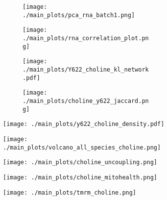 \begin{figure}[ht]
    \begin{subfigure}[t]{.2\textwidth}
        \begin{subfigure}[t]{\textwidth}
            \caption{}
            \texttt{[image: ./main\_plots/pca\_rna\_batch1.png]}        
        \end{subfigure}  
            \begin{subfigure}[t]{\textwidth}
            \caption{}
            \texttt{[image: ./main\_plots/rna\_correlation\_plot.png]}        
        \end{subfigure}  
    \end{subfigure}  
    \begin{subfigure}[t]{.2\textwidth}
        \begin{subfigure}[t]{\textwidth}
            \caption{}
            \texttt{[image: ./main\_plots/Y622\_choline\_kl\_network.pdf]}        
        \end{subfigure}  
            \begin{subfigure}[t]{\textwidth}
            \caption{}
            \texttt{[image: ./main\_plots/choline\_y622\_jaccard.png]}        
        \end{subfigure}  
    \end{subfigure} 
    \begin{subfigure}[t]{.4\textwidth}
        \caption{}
        \texttt{[image: ./main\_plots/y622\_choline\_density.pdf]}        
    \end{subfigure}  
    \begin{subfigure}[t]{.25\textwidth}
        \caption{}
        \texttt{[image: ./main\_plots/volcano\_all\_species\_choline.png]}        
    \end{subfigure}  
    \begin{subfigure}[t]{.15\textwidth}
        \caption{}
        \texttt{[image: ./main\_plots/choline\_uncoupling.png]}        
    \end{subfigure}  
    \begin{subfigure}[t]{.1\textwidth}
        \caption{}
        \texttt{[image: ./main\_plots/choline\_mitohealth.png]}        
    \end{subfigure}  
    \begin{subfigure}[t]{.2\textwidth}
        \caption{}
        \texttt{[image: ./main\_plots/tmrm\_choline.png]}        

\end{subfigure}
\end{figure}
